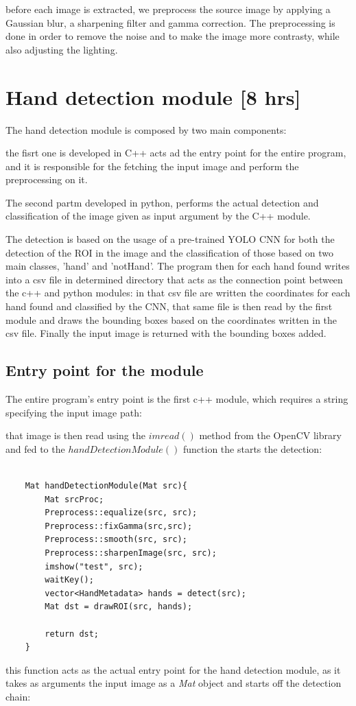 before each image is extracted, we preprocess the source image by applying a
Gaussian blur, a sharpening filter and gamma correction. The preprocessing is
done in order to remove
the noise and to make the image more contrasty, while also adjusting the
lighting.

\section{Hand detection module [8 hrs]}
The hand detection module is composed by two main components:

the fisrt one is developed in C++ acts ad the entry point for the entire
program, and it is responsible for the
fetching the input image and perform the preprocessing on it.

The second partm developed in python, performs the actual detection and
classification of the image given as input argument
by the C++ module.

The detection is based on the usage of a pre-trained YOLO CNN for both the
detection of the ROI in the image and the classification
of those based on two main classes, 'hand' and 'notHand'. The program then for
each hand found writes into a csv file in determined
directory that acts as the connection point between the c++ and python modules:
in that csv file are written the coordinates for each hand found and classified
by the CNN, that same file is then read by the first module and draws the
bounding boxes based on the coordinates written in the csv file. Finally the
input image is
returned with the bounding boxes added.

\subsection{Entry point for the module}

The entire program's entry point is the first c++ module, which requires a
string specifying the input image path:

that image is then read using the $imread()$ method from the OpenCV library and
fed to the $handDetectionModule()$ function the starts the detection:

\begin{lstlisting}

    Mat handDetectionModule(Mat src){
        Mat srcProc;
        Preprocess::equalize(src, src);
        Preprocess::fixGamma(src,src);
        Preprocess::smooth(src, src);
        Preprocess::sharpenImage(src, src);
        imshow("test", src);
        waitKey();
        vector<HandMetadata> hands = detect(src);
        Mat dst = drawROI(src, hands);
    
        return dst;
    }

\end{lstlisting}
this function acts as the actual entry point for the hand detection module, as
it takes as arguments the input image as a \textit{Mat} object and
starts off the detection chain:

